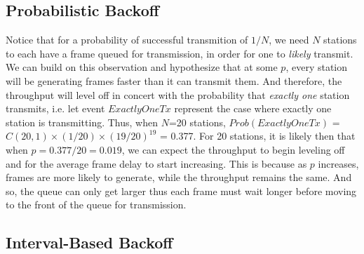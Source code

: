 \documentclass[twocolumn]{article}
\begin{document}
\subsection{Probabilistic Backoff}
Notice that for a probability of successful transmition of $1/N$, we need $N$ stations to each have a frame queued for transmission, in order for one to \emph{likely} transmit. We can build on this observation and hypothesize that at some $p$, every station will be generating frames faster than it can transmit them. And therefore, the throughput will level off in concert with the probability that \emph{exactly one} station transmits, i.e. let event $ExactlyOneTx$ represent the case where exactly one station is transmitting. Thus, when $N$=20 stations, $Prob(ExactlyOneTx)$ = $C(20,1)\times(1/20)\times(19/20)^{19}$ = 0.377. For 20 stations, it is likely then that when $p=0.377/20=0.019$, we can expect the throughput to begin leveling off and for the average frame delay to start increasing. This is because as $p$ increases, frames are more likely to generate, while the throughput remains the same. And so, the queue can only get larger thus each frame must wait longer before moving to the front of the queue for transmission.

\subsection{Interval-Based Backoff}



\end{document}
